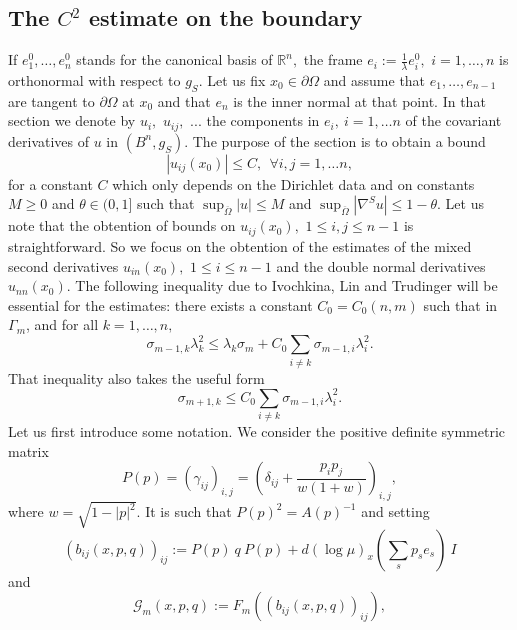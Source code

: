 \documentclass[10pt,reqno,oneside]{amsart}
\theoremstyle{definition}
\theoremstyle{remark}
\newcommand{\R}{\mathbb{R}}
\begin{document}
\subsection{The $C^2$ estimate on the boundary}
 If $e_1^0,\ldots,e_n^0$ stands for the canonical basis of $\R^n,$ the frame $e_i:=\frac{1}{\lambda} e_i^0,$ $i=1,\ldots,n$ is orthonormal with respect to $g_S.$ Let us fix $x_0\in\partial\Omega$ and assume that $e_1,\ldots,e_{n-1}$ are tangent to $\partial\Omega$ at $x_0$ and that $e_n$ is the inner normal at that point. In that section we denote by $u_i,$ $u_{ij},$ ... the components in $e_i,\ i=1,\ldots n$ of the covariant derivatives of $u$ in $(B^n,g_S)$. The purpose of the section is to obtain a bound
 $$|u_{ij}(x_0)|\leq C,\ \ \forall i,j=1,\ldots n,$$
 for a constant $C$ which only depends on the Dirichlet data and on constants $M\geq 0$ and $\theta\in (0,1]$ such that $\sup_{\overline{\Omega}}|u|\leq M$ and $\sup_{\overline{\Omega}}|\nabla^S u|\leq 1-\theta.$ Let us note that the obtention of bounds on $u_{ij}(x_0),$ $1\leq i,j\leq n-1$ is straightforward. So we focus on the obtention of the estimates of the mixed second derivatives $u_{in}(x_0),$ $1\leq i\leq n-1$ and the double normal derivatives $u_{nn}(x_0).$ The following inequality due to Ivochkina, Lin and Trudinger \cite[ineq. (26)]{LT} will be essential for the estimates: there exists a constant $C_0=C_0(n,m)$ such that in $\Gamma_m$, and for all $k=1,\ldots,n,$
 \begin{equation}\label{est C2b ineg ILT1}
 \sigma_{m-1,k}\lambda_k^2\leq\lambda_k\sigma_m+C_0\sum_{i\neq k}\sigma_{m-1,i}\lambda_i^2.
 \end{equation}
 That inequality also takes the useful form
 \begin{equation}\label{est C2b ineg ILT2}
 \sigma_{m+1,k}\leq C_0\sum_{i\neq k}\sigma_{m-1,i}\lambda_i^2.
 \end{equation}
 Let us first introduce some notation. We consider the positive definite symmetric matrix 
\begin{equation}\label{est C2b def matrix P}
P(p)=\left(\gamma_{ij}\right)_{i,j}=\left(\delta_{ij}+\frac{p_ip_j}{w(1+w)}\right)_{i,j},
\end{equation}
where $w=\sqrt{1-|p|^2}.$ It is such that $P(p)^2=A(p)^{-1}$ and setting 
\begin{equation}\label{def bij xpq}
(b_{ij}(x,p,q))_{ij}:=P(p)\ q\  P(p)+d(\log\mu)_x(\sum_sp_s e_s)\ I
\end{equation}
and
\begin{equation}\label{def Fmxpq estC2b}
\mathcal{G}_m(x,p,q):=F_m((b_{ij}(x,p,q))_{ij}),
\end{equation}
\end{document}
